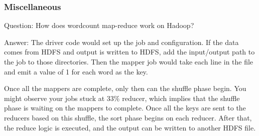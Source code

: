 \documentclass[11pt]{beamer}
\begin{document}
\begin{frame}
\frametitle{Miscellaneous}
\begin{block}{Question:}
	How does wordcount map-reduce work on Hadoop?
\end{block}
\begin{block}{Answer:}
	The driver code would set up the job and configuration. If the data comes from HDFS and output is written to HDFS, add the input/output path to the job to those directories. Then the mapper job would take each line in the file and emit a value of 1 for each word as the key.
	
	
	Once all the mappers are complete, only then can the shuffle phase begin. You might observe your jobs stuck at $33\%$ reducer, which implies that the shuffle phase is waiting on the mappers to complete. Once all the keys are sent to the reducers based on this shuffle, the sort phase begins on each reducer. After that, the reduce logic is executed, and the output can be written to another HDFS file.
\end{block}
\end{frame}
\end{document}
